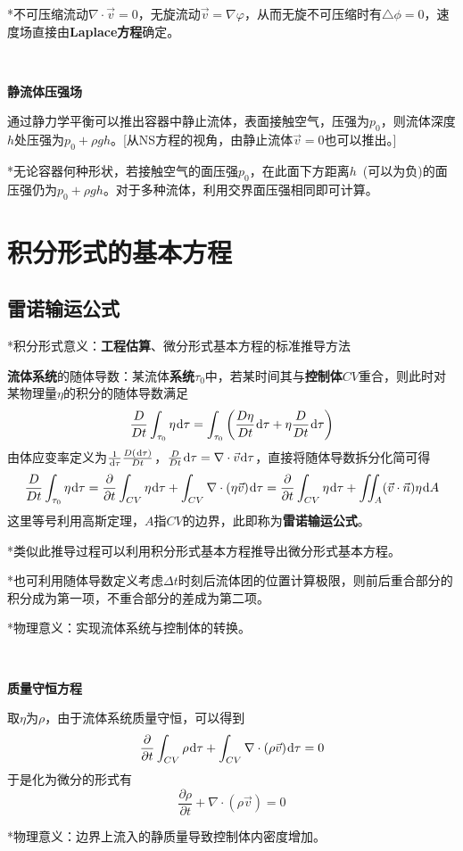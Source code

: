 \documentclass[a4paper,UTF8,fontset=windows]{ctexart}
\newcommand*{\dr}{\hspace{0.07em}\mathrm{d}}
\begin{document}
*不可压缩流动$\nabla\cdot\vec{v}=0$，无旋流动$\vec{v}=\nabla\varphi$，从而无旋不可压缩时有$\triangle\phi=0$，速度场直接由\textbf{Laplace方程}确定。

\

\textbf{静流体压强场}

通过静力学平衡可以推出容器中静止流体，表面接触空气，压强为$p_0$，则流体深度$h$处压强为$p_0+\rho gh$。[从NS方程的视角，由静止流体$\vec{v}=0$也可以推出。]

*无论容器何种形状，若接触空气的面压强$p_0$，在此面下方距离$h$\ (可以为负)的面压强仍为$p_0+\rho gh$。对于多种流体，利用交界面压强相同即可计算。

\section{积分形式的基本方程}
\subsection{雷诺输运公式}
*积分形式意义：\textbf{工程估算}、微分形式基本方程的标准推导方法

\textbf{流体系统}的随体导数：某流体\textbf{系统}$\tau_0$中，若某时间其与\textbf{控制体}$CV$重合，则此时对某物理量$\eta$的积分的随体导数满足
$$\frac{D}{Dt}\int_{\tau_0}\eta\dr\tau=\int_{\tau_0}\bigg(\frac{D\eta}{Dt}\dr\tau+\eta\frac{D}{Dt}\dr\tau\bigg)$$
由体应变率定义为$\frac{1}{\dr\tau}\frac{D(\dr\tau)}{Dt}$，$\frac{D}{Dt}\dr\tau=\nabla\cdot\vec{v}\dr\tau$，直接将随体导数拆分化简可得
$$\frac{D}{Dt}\int_{\tau_0}\eta\dr\tau=\frac{\partial}{\partial t}\int_{CV}\eta\dr\tau+\int_{CV}\nabla\cdot(\eta\vec{v})\dr\tau=\frac{\partial}{\partial t}\int_{CV}\eta\dr\tau+\iint_A(\vec{v}\cdot\vec{n})\eta\dr A$$
这里等号利用高斯定理，$A$指$CV$的边界，此即称为\textbf{雷诺输运公式}。

*类似此推导过程可以利用积分形式基本方程推导出微分形式基本方程。

*也可利用随体导数定义考虑$\Delta t$时刻后流体团的位置计算极限，则前后重合部分的积分成为第一项，不重合部分的差成为第二项。

*物理意义：实现流体系统与控制体的转换。

\

\textbf{质量守恒方程}

取$\eta$为$\rho$，由于流体系统质量守恒，可以得到
$$\frac{\partial}{\partial t}\int_{CV}\rho\dr\tau+\int_{CV}\nabla\cdot(\rho\vec{v})\dr\tau=0$$
于是化为微分的形式有
$$\frac{\partial\rho}{\partial t}+\nabla\cdot(\rho\vec{v})=0$$

*物理意义：边界上流入的静质量导致控制体内密度增加。
\end{document}

